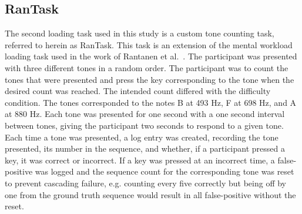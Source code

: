 \documentclass[11pt]{article}
\begin{document}
	\subsection{RanTask}
	The second loading task used in this study is a custom tone counting task, referred to herein as RanTask. This task is an extension of the mental workload loading task used in the work of Rantanen et al.~\cite{Rantanen}. The participant was presented with three different tones in a random order. The participant was to count the tones that were presented and press the key corresponding to the tone when the desired count was reached. The intended count differed with the difficulty condition. The tones corresponded to the notes B at 493 Hz, F at 698 Hz, and A at 880 Hz. Each tone was presented for one second with a one second interval between tones, giving the participant two seconds to respond to a given tone. Each time a tone was presented, a log entry was created, recording the tone presented, its number in the sequence, and whether, if a participant pressed a key, it was correct or incorrect. If a key was pressed at an incorrect time, a false-positive was logged and the sequence count for the corresponding tone was reset to prevent cascading failure, e.g. counting every five correctly but being off by one from the ground truth sequence would result in all false-positive without the reset. 
	
	\begin{table}[]
	\centering
	\caption[RanTask Load Condition Tone Counts]{RanTask Desired Tone Counts}
	
	
	\label{tab:rantask-params}
	\end{table}
	
\end{document}

